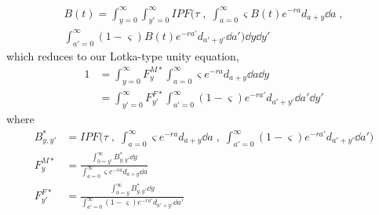 \begin{equation}
\label{eq:ex2sexIPFunity3}
\begin{split}
B(t) = \int _{y=0}^\infty \int _{y'=0}^\infty IPF\Bigg(\tau\;,\;
 \int_{a=0}^\infty \varsigma B(t) e^{-ra}d_{a+y} \dd a\;, \\ 
 \int_{a'=0}^\infty (1-\varsigma) B(t)e^{-ra'}d_{a'+y'} \dd a'\Bigg) \dd y \dd
 y'
\end{split}
\end{equation}
which reduces to our Lotka-type unity equation,
\begin{align}
\label{eq:ex2sexIPFunity3}
1 &= \int _{y=0}^\infty F_{y}^{M\ast} \int_{a=0}^\infty \varsigma e^{-ra}d_{a+y}
\dd a \dd y \\ 
&= \int _{y'=0}^\infty F_{y'}^{F\ast} \int_{a'=0}^\infty
(1-\varsigma) e^{-ra'}d_{a'+y'} \dd a' \dd y'
\end{align}
where
\begin{align}
\label{eq:exipfbyyp}
B_{y,y'}^\ast &= IPF\Bigg(\tau\;,\;
 \int_{a=0}^\infty \varsigma e^{-ra}d_{a+y} \dd a\;,\;
 \int_{a'=0}^\infty (1-\varsigma) e^{-ra'}d_{a'+y'} \dd a'\Bigg) \\
 \label{eq:exipffy}
F_{y}^{M\ast} &= \frac{\int_{0=y'}^\infty B_{y,y'}^\ast \dd
y}{\int_{a=0}^\infty\varsigma e^{-ra}d_{a+y} \dd a} \\
 \label{eq:exipffyp}
F_{y'}^{F\ast} &= \frac{\int_{0=y}^\infty B_{y,y'}^\ast \dd
y}{\int_{a'=0}^\infty (1-\varsigma) e^{-ra'}d_{a'+y'} \dd a'} 
\end{align}




